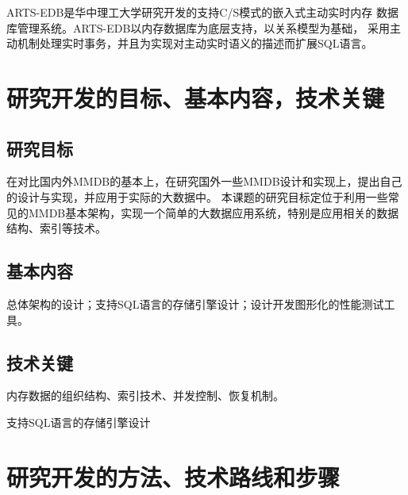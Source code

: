 \documentclass[proposal]{zjutreport}
\begin{document}
ARTS-EDB是华中理工大学研究开发的支持C/S模式的嵌入式主动实时内存
数据库管理系统。ARTS-EDB以内存数据库为底层支持，以关系模型为基础，
采用主动机制处理实时事务，并且为实现对主动实时语义的描述而扩展SQL语言。

\chapter{研究开发的目标、基本内容，技术关键}
\section{研究目标}
在对比国内外MMDB的基本上，在研究国外一些MMDB设计和实现上，提出自己的设计与实现，并应用于实际的大数据中。
本课题的研究目标定位于利用一些常见的MMDB基本架构，实现一个简单的大数据应用系统，特别是应用相关的数据结构、索引等技术。

\section{基本内容}
总体架构的设计；支持SQL语言的存储引擎设计；设计开发图形化的性能测试工具。

\section{技术关键}
内存数据的组织结构、索引技术、并发控制、恢复机制。

支持SQL语言的存储引擎设计

\chapter{研究开发的方法、技术路线和步骤}


\backmatter
\endgroup %
\clearpage %

\nocite{*}                                   %

\end{document}
